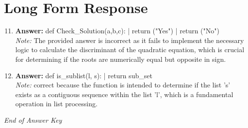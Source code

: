 \documentclass[12pt]{article}
\begin{document}
\section*{Long Form Response}
\begin{enumerate}[label=\arabic*.]
\setcounter{enumi}{10}
\item \textbf{Answer:} def Check\_Solution(a,b,c): | return ("Yes") | return ("No")
\\ \textit{Note:} The provided answer is incorrect as it fails to implement the necessary logic to calculate the discriminant of the quadratic equation, which is crucial for determining if the roots are numerically equal but opposite in sign.
\item \textbf{Answer:} def is\_sublist(l, s): | return sub\_set
\\ \textit{Note:} correct because the function is intended to determine if the list 's' exists as a contiguous sequence within the list 'l', which is a fundamental operation in list processing.
\end{enumerate}

\vfill
\noindent\textit{End of Answer Key}
\end{document}

